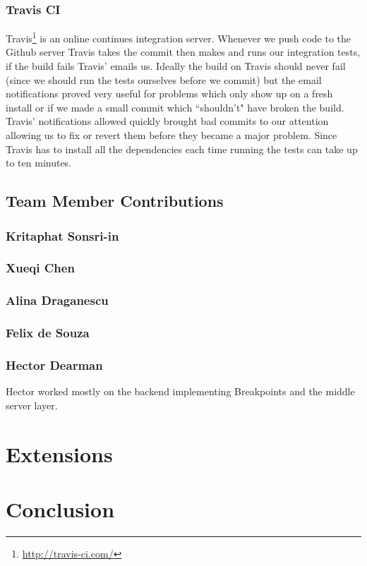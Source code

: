 \documentclass[11pt, a4paper]{article}
\begin{document}
\subsubsection{Travis CI}
Travis\footnote{\url{http://travis-ci.com/}} is an online continues integration server.
Whenever we push code to the Github server Travis takes the commit then makes and runs our integration tests, if the build fails Travis' emails us.
Ideally the build on Travis should never fail (since we should run the tests ourselves before we commit) but the email notifications proved very useful for problems which only show up on a fresh install or if we made a small commit which ``shouldn't" have broken the build.
Travis' notifications allowed quickly brought bad commits to our attention allowing us to fix or revert them before they became a major problem.  
Since Travis has to install all the dependencies each time running the tests can take up to ten minutes. 



\subsection{Team Member Contributions}
\subsubsection{Kritaphat Sonsri-in}
\subsubsection{Xueqi Chen}
\subsubsection{Alina Draganescu}
\subsubsection{Felix de Souza}
\subsubsection{Hector Dearman}
Hector worked mostly on the backend implementing Breakpoints and the middle server layer. 

\section{Extensions}

\section{Conclusion}
\end{document}
